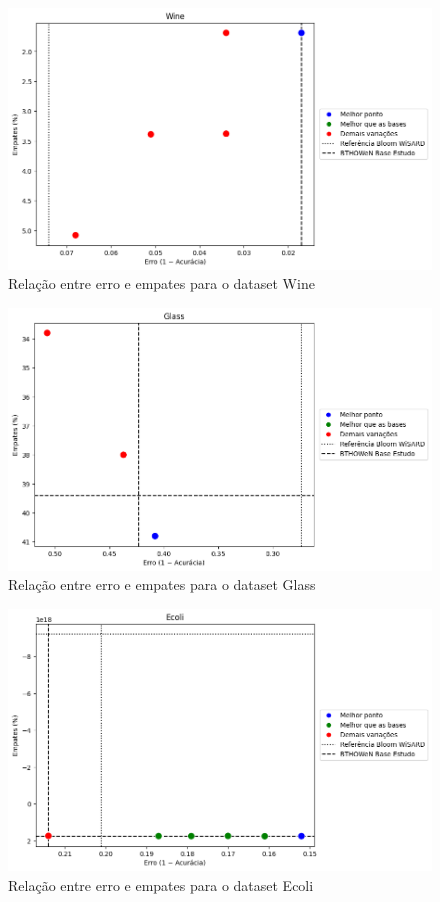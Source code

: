 \documentclass{article}
\begin{document}
\begin{figure}[H]
\centering
\includegraphics[width=1.1\textwidth]{figures/image3.png}
\caption{Relação entre erro e empates para o dataset Wine}
\label{fig:wine}
\end{figure}

\begin{figure}[H]
\centering
\includegraphics[width=1.1\textwidth]{figures/image5.png}
\caption{Relação entre erro e empates para o dataset Glass}
\label{fig:glass}
\end{figure}

\begin{figure}[H]
\centering
\includegraphics[width=1.1\textwidth]{figures/image6.png}
\caption{Relação entre erro e empates para o dataset Ecoli}
\label{fig:ecoli}
\end{figure}
\end{document}
